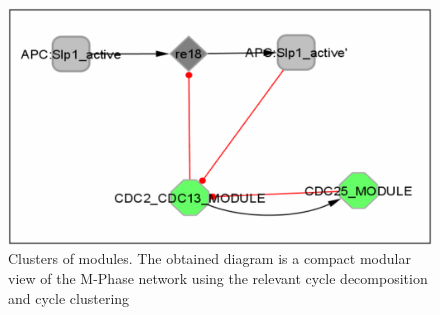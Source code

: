 \begin{figure}
\centering
\includegraphics[width=14 cm]{graphics/Clusters_of_modules_using_the_cycle_decomposition}
\caption{Clusters of modules. The obtained diagram is a compact modular view of the M-Phase network using the relevant cycle decomposition and cycle clustering}
\label{Clusters_of_modules_using_the_cycle_decomposition}
\end{figure}

